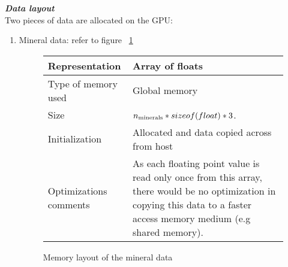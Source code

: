 \documentclass[11pt]{IEEEtran}
\begin{document}
\textit{\textbf{Data layout}}\\[1\baselineskip] 
Two pieces of data are allocated on the GPU:\\
	\begin{enumerate}
	\item Mineral data: refer to figure ~\ref{Mineral Data Layout}\\
	\begin{figure*}[ht]
	  \begin{center}	
	  \caption[Mineral data layout]{Memory layout of the mineral data}
	  \label{Mineral Data Layout}
	    \begin{tabular}{|p{4cm}|p{12cm}|}
  	    \hline
  	    Representation & Array of floats\\
  	    \hline
  	    Type of memory used & Global memory\\
  	    \hline
  	    Size & $ n\textsubscript{minerals} * sizeof(float) * 3 $.\\
  	    \hline
  	    Initialization & Allocated and data copied across from host\\
  	    \hline
  	    Optimizations comments & As each floating point value is read only once from this array, there would be no optimization in copying this data to a faster access memory medium (e.g shared memory).\\
  	    \hline
  	    \end{tabular}\newline
  	  \end{center}
  \end{figure*}
  

\end{enumerate}
\end{document}
